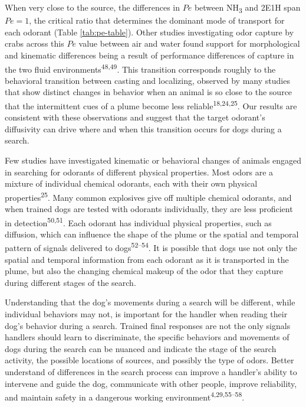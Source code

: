 \documentclass[
]{article}
\begin{document}
When very close to the source, the differences in \(Pe\) between NH\textsubscript{3} and 2E1H span \(Pe=1\), the critical ratio that determines the dominant mode of transport for each odorant (Table \ref{tab:pe-table}). Other studies investigating odor capture by crabs across this \(Pe\) value between air and water found support for morphological and kinematic differences being a result of performance differences of capture in the two fluid environments\textsuperscript{48,49}. This transition corresponds roughly to the behavioral transition between casting and localizing, observed by many studies that show distinct changes in behavior when an animal is so close to the source that the intermittent cues of a plume become less reliable\textsuperscript{18,24,25}. Our results are consistent with these observations and suggest that the target odorant's diffusivity can drive where and when this transition occurs for dogs during a search.

Few studies have investigated kinematic or behavioral changes of animals engaged in searching for odorants of different physical properties. Most odors are a mixture of individual chemical odorants, each with their own physical properties\textsuperscript{25}. Many common explosives give off multiple chemical odorants, and when trained dogs are tested with odorants individually, they are less proficient in detection\textsuperscript{50,51}. Each odorant has individual physical properties, such as diffusion, which can influence the shape of the plume or the spatial and temporal pattern of signals delivered to dogs\textsuperscript{52--54}. It is possible that dogs use not only the spatial and temporal information from each odorant as it is transported in the plume, but also the changing chemical makeup of the odor that they capture during different stages of the search.

Understanding that the dog's movements during a search will be different, while individual behaviors may not, is important for the handler when reading their dog's behavior during a search. Trained final responses are not the only signals handlers should learn to discriminate, the specific behaviors and movements of dogs during the search can be nuanced and indicate the stage of the search activity, the possible locations of sources, and possibly the type of odors. Better understand of differences in the search process can improve a handler's ability to intervene and guide the dog, communicate with other people, improve reliability, and maintain safety in a dangerous working environment\textsuperscript{4,29,55--58}.
\end{document}
